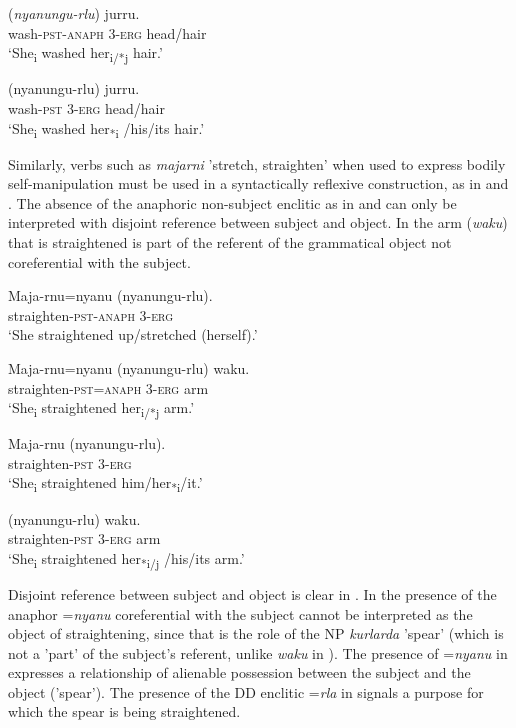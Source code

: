 \documentclass[output=paper]{../langscibook}
\begin{document}
\ea%
    \label{ex:laughren:27}
\ea
\label{ex:laughren:27a}
 (\textit{nyanungu-rlu})  jurru.\\
    wash-\textsc{pst}{}-\textsc{anaph}  3-\textsc{erg}  head/hair\\
\glt `She\textsubscript{i} washed her\textsubscript{i/*j} hair.'

\ex
\label{ex:laughren:27b}
 ({nyanungu-rlu}) {jurru.}\\
    wash-\textsc{pst}  3-\textsc{erg}  head/hair\\
\glt `She\textsubscript{i} washed her\textsubscript{*i} /his/its hair.'
\z
\z

Similarly, verbs such as \textit{majarni} 'stretch, straighten' when used to express bodily self-manipulation must be used in a syntactically reflexive construction, as in  and . The absence of the anaphoric non-subject enclitic as in  and  can only be interpreted with disjoint reference between subject and object. In  the arm (\textit{waku}) that is straightened is part of the referent of the grammatical object not coreferential with the subject.

\ea%
    \label{ex:laughren:28}
\ea
\label{ex:laughren:28a}
\gll  Maja-rnu=nyanu  (nyanungu-rlu). \\
    straighten\textsc{{}-pst-anaph  3-erg}\\
\glt `She straightened up/stretched (herself).'

\ex
\label{ex:laughren:28b}
\gll  Maja-rnu=nyanu  (nyanungu-rlu)  waku.\\
    straighten\textsc{{}-pst=anaph} 3-\textsc{erg}  arm\\
\glt `She\textsubscript{i} straightened her\textsubscript{i/*j} arm.'

\ex
\label{ex:laughren:28c}
\gll  Maja-rnu  (nyanungu-rlu).\\
    straighten-\textsc{pst}  3\textsc{{}-erg}\\
\glt `She\textsubscript{i} straightened him/her\textsubscript{*i}/it.'

\ex
\label{ex:laughren:28d}
 ({nyanungu-rlu}) {waku.}\\
    straighten-\textsc{pst}  3-\textsc{erg}  arm\\
\glt `She\textsubscript{i} straightened her\textsubscript{*i/j} /his/its arm.'
\z
\z


Disjoint reference between subject and object is clear in . In  the presence of the anaphor =\textit{nyanu} coreferential with the subject cannot be interpreted as the object of straightening, since that is the role of the NP \textit{kurlarda} 'spear' (which is not a 'part' of the subject's referent, unlike \textit{waku} in ). The presence of =\textit{nyanu} in  expresses a relationship of alienable possession between the subject and the object ('spear'). The presence of the DD enclitic =\textit{rla} in  signals a purpose for which the spear is being straightened.
\end{document}
